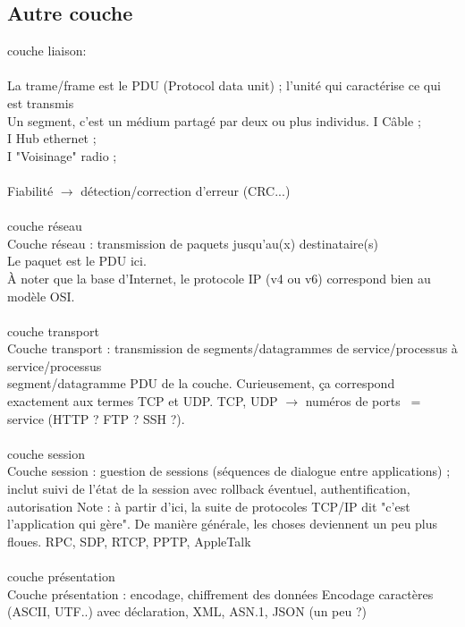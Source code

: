 \documentclass[5pt]{article}
\begin{document}
\begin{scriptsize}
\subsection{Autre couche}
couche liaison:\\
\\
La trame/frame est le PDU (Protocol data unit) ; l’unité qui caractérise ce qui est transmis\\
Un segment, c’est un médium partagé par deux ou plus individus. I Câble ;\\
I Hub ethernet ;\\
I "Voisinage" radio ;\\
\\
Fiabilité $\longrightarrow$ détection/correction d’erreur (CRC...)\\
\\
couche réseau\\
Couche réseau : transmission de paquets jusqu’au(x) destinataire(s)\\
Le paquet est le PDU ici.\\
À noter que la base d’Internet, le protocole IP (v4 ou v6) correspond bien au modèle OSI.\\
\\
couche transport\\
Couche transport : transmission de segments/datagrammes de service/processus à service/processus\\
segment/datagramme PDU de la couche. Curieusement, ça correspond exactement aux termes TCP et UDP. TCP, UDP $\longrightarrow$ numéros de ports ~= service (HTTP ? FTP ? SSH ?).\\
\\
couche session\\
Couche session : guestion de sessions (séquences de dialogue entre applications) ; inclut suivi de l’état de la session avec rollback éventuel, authentification, autorisation Note : à partir d’ici, la suite de protocoles TCP/IP dit "c’est l’application qui gère". De manière générale, les choses deviennent un peu plus floues. RPC, SDP, RTCP, PPTP, AppleTalk\\
\\
couche présentation\\
Couche présentation : encodage, chiffrement des données Encodage caractères (ASCII, UTF..) avec déclaration, XML, ASN.1, JSON (un peu ?)\\
\\

\end{scriptsize}
\end{document}
